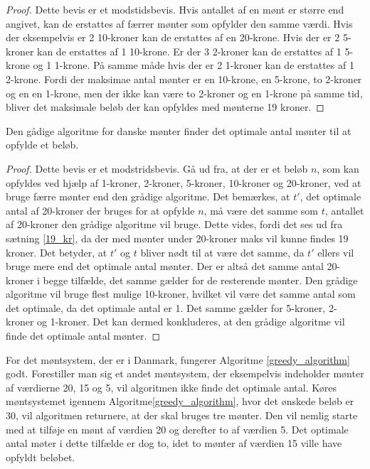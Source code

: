 \begin{proof}
\label{19_kr_bevis}
Dette bevis er et modstidsbevis. 
Hvis antallet af en mønt er større end angivet, kan de erstattes af færrer mønter som opfylder den samme værdi. 
Hvis der eksempelvis er 2 10-kroner kan de erstattes af en 20-krone. 
Hvis der er 2 5-kroner kan de erstattes af 1 10-krone. 
Er der 3 2-kroner kan de erstattes af 1 5-krone og 1 1-krone. 
På samme måde hvis der er 2 1-kroner kan de erstattes af 1 2-krone. 
Fordi der maksimae antal mønter er en 10-krone, en 5-krone, to 2-kroner og en en 1-krone, men der ikke kan være to 2-kroner og en 1-krone på samme tid, bliver det maksimale beløb der kan opfyldes med mønterne 19 kroner. 
\end{proof}

\begin{thm}
\label{gradig_satning}
Den gådige algoritme for danske mønter finder det optimale antal mønter til at opfylde et beløb.
\end{thm}

\begin{proof}
\label{gradig_bevis}
Dette bevis er et modstridsbevis. 
Gå ud fra, at der er et beløb $n$, som kan opfyldes ved hjælp af 1-kroner, 2-kroner, 5-kroner, 10-kroner og 20-kroner, ved at bruge færre mønter end den grådige algoritme. 
Det bemærkes, at $t'$, det optimale antal af 20-kroner der bruges for at opfylde $n$, må være det samme som $t$, antallet af 20-kroner den grådige algoritme vil bruge. 
Dette vides, fordi det ses ud fra sætning \ref{19_kr}, da der med mønter under 20-kroner maks vil kunne findes 19 kroner. 
Det betyder, at $t'$ og $t$ bliver nødt til at være det samme, da $t'$ ellers vil bruge mere end det optimale antal mønter. 
Der er altså det samme antal 20-kroner i begge tilfælde, det samme gælder for de resterende mønter. 
Den grådige algoritme vil bruge flest mulige 10-kroner, hvilket vil være det samme antal som det optimale, da det optimale antal er 1. 
Det samme gælder for 5-kroner, 2-kroner og 1-kroner. 
Det kan dermed konkluderes, at den grådige algoritme vil finde det optimale antal mønter.

\end{proof}

\noindent For det møntsystem, der er i Danmark, fungerer Algoritme \ref{greedy_algorithm} godt. 
Forestiller man sig et andet møntsystem, der eksempelvis indeholder mønter af værdierne 20, 15 og 5, vil algoritmen ikke finde det optimale antal. 
Køres møntsystemet igennem Algoritme\ref{greedy_algorithm}, hvor det ønskede beløb er 30, vil algoritmen returnere, at der skal bruges tre mønter. 
Den vil nemlig starte med at tilføje en mønt af værdien 20 og derefter to af værdien 5.
Det optimale antal møter i dette tilfælde er dog to, idet to mønter af værdien 15 ville have opfyldt beløbet.
%
